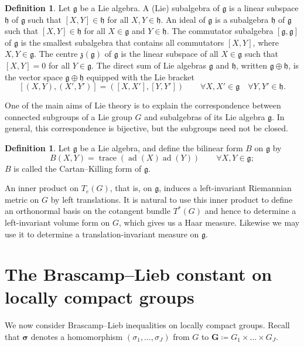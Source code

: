 \documentclass[12pt,twoside,a4paper]{amsart}
\theoremstyle{definition}
\newtheorem{defn}[thm]{Definition}%
\theoremstyle{remark}
\numberwithin{equation}{section}
\newcommand{\Lie}[1]{\mathfrak{#1}}
\newcommand{\trace}{\operatorname{trace}}
\newcommand{\ad}{\operatorname{ad}}
\newcommand{\bss}{\boldsymbol{\sigma}}
\newcommand{\bsG}{\boldsymbol{G}}
\begin{document}
\begin{defn}
Let $\Lie{g}$ be a Lie algebra.
A (Lie) subalgebra of $\Lie{g}$ is a linear subspace $\Lie{h}$ of $\Lie{g}$ such
that $[X,Y]\in\Lie{h}$ for all $X, Y\in\Lie{h}$.
An ideal of $\Lie{g}$ is a subalgebra $\Lie{h}$ of $\Lie{g}$ such that  $[X,Y]\in\Lie{h}$ for all $X\in\Lie{g}$ and $Y\in\Lie{h}$.
The commutator subalgebra $[\Lie{g}, \Lie{g}]$ of $\Lie{g}$ is the smallest subalgebra that contains all commutators $[X,Y]$, where $X, Y \in \Lie{g}$.
The centre $\Lie{z}(\Lie{g})$ of $\Lie{g}$ is the linear subspace of all $X \in \Lie{g}$ such that $[X,Y]=0$ for all $Y \in \Lie{g}$.
The direct sum of Lie algebras $\Lie{g}$ and $\Lie{h}$, written $\Lie{g} \oplus \Lie{h}$, is the vector space $\Lie{g} \oplus \Lie{h}$ equipped with the Lie bracket 
\[
[ (X,Y), (X', Y')] = ([ X,X'], [Y,  Y'] )
\qquad\forall X, X' \in \Lie{g} \quad\forall Y, Y' \in \Lie{h}.
\]
\end{defn}

One of the main aims of Lie theory is to explain the correspondence between connected subgroups of a Lie group $G$ and subalgebras of its Lie algebra $\Lie{g}$.
In general, this correspondence is bijective, but the subgroups need not be closed.

\begin{defn}\label{def:Killing}
Let $\Lie{g}$ be a Lie algebra, and define the bilinear form $B$ on $\Lie{g}$ by
\[
B(X,Y) = \trace(\ad(X) \ad(Y))
\qquad\forall X, Y \in \Lie{g} ;
\]
$B$ is called the Cartan--Killing form of $\Lie{g}$.
\end{defn}

An inner product on $T_e(G)$, that is, on $\Lie{g}$, induces a left-invariant Riemannian metric on $G$ by left translations. 
It is natural to use this inner product to define an orthonormal basis on the cotangent bundle $T^*(G)$ and hence to determine a left-invariant volume form on $G$, which gives us a Haar measure.
Likewise we may use it to determine a translation-invariant measure on $\Lie{g}$.






\section{The Brascamp--Lieb constant on locally compact groups}\label{sec:BL-general-groups}

We now consider Brascamp--Lieb inequalities on  locally compact groups. 
Recall that $\bss$ denotes a homomorphism $(\sigma_1, \dots, \sigma_J)$ from $G$ to $\bsG  \coloneqq  G_1 \times \dots \times G_J$.
\end{document}
